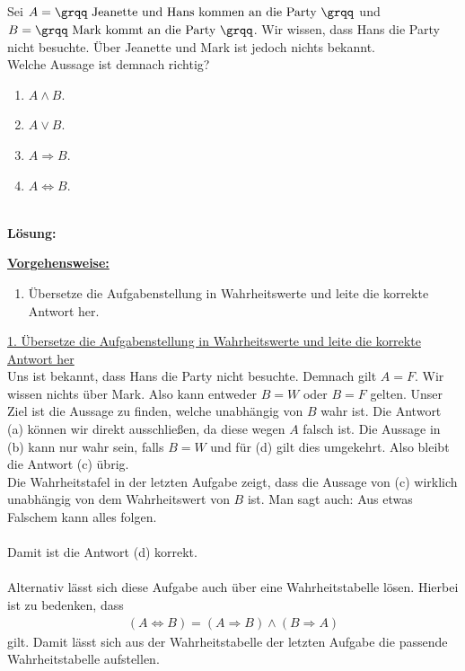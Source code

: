 \newpage

\subsection*{}
Sei $ A = \textrm{\grqq Jeanette und Hans kommen an die Party \grqq} $
und $ B = \textrm{\grqq Mark kommt an die Party \grqq}  $.
Wir wissen, dass Hans die Party nicht besuchte.
Über Jeanette und Mark ist jedoch nichts bekannt.\\
Welche Aussage ist demnach richtig?
\renewcommand{\labelenumi}{(\alph{enumi})}
\begin{enumerate}
	\item $ A \wedge B $.
	\item $ A \vee B $.
	\item $ A \Rightarrow B $.
	\item $ A \Leftrightarrow B $.
\end{enumerate}
\ \\
\textbf{Lösung:}
\begin{mdframed}
	\underline{\textbf{Vorgehensweise:}}
	\renewcommand{\labelenumi}{\theenumi.}
	\begin{enumerate}
		\item Übersetze die Aufgabenstellung in Wahrheitswerte und leite die korrekte Antwort her.
	\end{enumerate}
\end{mdframed}
\underline{1. Übersetze die Aufgabenstellung in Wahrheitswerte und leite die korrekte Antwort her}\\
Uns ist bekannt, dass Hans die Party nicht besuchte. 
Demnach gilt $ A = F $.
Wir wissen nichts über Mark. Also kann entweder  $ B= W $ oder $ B = F $ gelten.
Unser Ziel ist die Aussage zu finden, welche unabhängig von $ B  $ wahr ist.
Die Antwort (a) können wir direkt ausschließen, da diese wegen $ A $ falsch ist.
Die Aussage in (b) kann nur wahr sein, falls $ B = W $ und für (d) gilt dies umgekehrt.
Also bleibt die Antwort (c) übrig.\\
Die Wahrheitstafel in der letzten Aufgabe zeigt, dass die Aussage von (c) wirklich unabhängig von dem Wahrheitswert von $ B $ ist.
Man sagt auch: \grqq Aus etwas Falschem kann alles folgen\grqq.\\
\\
Damit ist die Antwort (d) korrekt.\\
\\
Alternativ lässt sich diese Aufgabe auch über eine Wahrheitstabelle lösen.
Hierbei ist zu bedenken, dass
\begin{align*}
	(A \Leftrightarrow B)
	=
	(A\Rightarrow B) \wedge (B \Rightarrow A)
\end{align*}
gilt. Damit lässt sich aus der Wahrheitstabelle der letzten Aufgabe die passende Wahrheitstabelle aufstellen.
 

